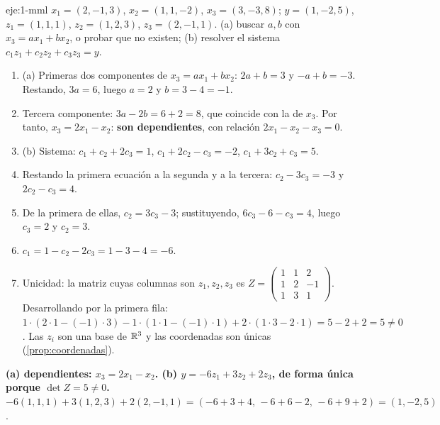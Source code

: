 \begin{solucion}{eje:1-mml}
\datos $x_1=(2,-1,3)$, $x_2=(1,1,-2)$, $x_3=(3,-3,8)$; $y=(1,-2,5)$, $z_1=(1,1,1)$, $z_2=(1,2,3)$, $z_3=(2,-1,1)$.
\planteamiento (a) buscar $a,b$ con $x_3=ax_1+bx_2$, o probar que no existen; (b) resolver el sistema $c_1z_1+c_2z_2+c_3z_3=y$.
\pasos
\begin{enumerate}[label=\arabic*.]
  \item (a) Primeras dos componentes de $x_3=ax_1+bx_2$: $2a+b=3$ y $-a+b=-3$. Restando, $3a=6$, luego $a=2$ y $b=3-4=-1$.
  \item Tercera componente: $3a-2b=6+2=8$, que coincide con la de $x_3$. Por tanto, $x_3=2x_1-x_2$: \textbf{son dependientes}, con relación $2x_1-x_2-x_3=0$.
  \item (b) Sistema: $c_1+c_2+2c_3=1$, $c_1+2c_2-c_3=-2$, $c_1+3c_2+c_3=5$.
  \item Restando la primera ecuación a la segunda y a la tercera: $c_2-3c_3=-3$ y $2c_2-c_3=4$.
  \item De la primera de ellas, $c_2=3c_3-3$; sustituyendo, $6c_3-6-c_3=4$, luego $c_3=2$ y $c_2=3$.
  \item $c_1=1-c_2-2c_3=1-3-4=-6$.
  \item Unicidad: la matriz cuyas columnas son $z_1,z_2,z_3$ es $Z=\begin{pmatrix}1&1&2\\1&2&-1\\1&3&1\end{pmatrix}$. Desarrollando por la primera fila: $1\cdot(2\cdot 1-(-1)\cdot 3)-1\cdot(1\cdot 1-(-1)\cdot 1)+2\cdot(1\cdot 3-2\cdot 1)=5-2+2=5\ne 0$. Las $z_i$ son una base de $\mathbb{R}^{3}$ y las coordenadas son únicas (\cref{prop:coordenadas}).
\end{enumerate}
\resultado \textbf{(a) dependientes: $x_3=2x_1-x_2$. (b) $y=-6z_1+3z_2+2z_3$, de forma única porque $\det Z=5\ne 0$.}
\comprobacion $-6(1,1,1)+3(1,2,3)+2(2,-1,1)=(-6+3+4,\,-6+6-2,\,-6+9+2)=(1,-2,5)$.
\end{solucion}

